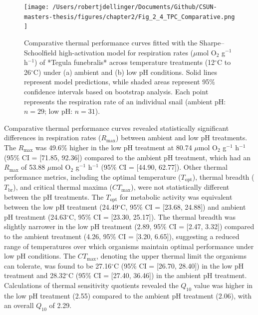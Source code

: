 \documentclass{CSUNthesis}
\begin{document}
\begin{figure}[H]
  \centering
  \texttt{[image:  /Users/robertjdellinger/Documents/Github/CSUN-masters-thesis/figures/chapter2/Fig\_2\_4\_TPC\_Comparative.png ]}
  \caption[Comparative thermal performance curves for ambient and low pH treatments.]{Comparative thermal performance curves fitted with the Sharpe--Schoolfield high-activation model for respiration rates ($\mu$mol O$_2$ g$^{-1}$ h$^{-1}$) of *Tegula funebralis* across temperature treatments (12$^\circ$C to 26$^\circ$C) under (a) ambient and (b) low pH conditions. Solid lines represent model predictions, while shaded areas represent 95\% confidence intervals based on bootstrap analysis. Each point represents the respiration rate of an individual snail (ambient pH: $n=29$; low pH: $n=31$).}
  \label{fig:tpc_comparative}
\end{figure}

Comparative thermal performance curves revealed statistically significant differences in respiration rates (\(R_{\text{max}}\)) between ambient and low pH treatments. The \(R_{\text{max}}\) was 49.6\% higher in the low pH treatment at 80.74 \(\mu\)mol O\(_2\) g\(^{-1}\) h\(^{-1}\) (95\% CI = {[}71.85, 92.36{]}) compared to the ambient pH treatment, which had an \(R_{\text{max}}\) of 53.88 \(\mu\)mol O\(_2\) g\(^{-1}\) h\(^{-1}\) (95\% CI = {[}44.90, 62.77{]}). Other thermal performance metrics, including the optimal temperature (\(T_{\text{opt}}\)), thermal breadth (\(T_{\text{br}}\)), and critical thermal maxima (\(CT_{\text{max}}\)), were not statistically different between the pH treatments. The \(T_{\text{opt}}\) for metabolic activity was equivalent between the low pH treatment (24.49\(^\circ\)C, 95\% CI = {[}23.68, 24.88{]}) and ambient pH treatment (24.63\(^\circ\)C, 95\% CI = {[}23.30, 25.17{]}). The thermal breadth was slightly narrower in the low pH treatment (2.89, 95\% CI = {[}2.47, 3.32{]}) compared to the ambient treatment (4.26, 95\% CI = {[}3.20, 6.65{]}), suggesting a reduced range of temperatures over which organisms maintain optimal performance under low pH conditions. The \(CT_{\text{max}}\), denoting the upper thermal limit the organisms can tolerate, was found to be 27.16\(^\circ\)C (95\% CI = {[}26.70, 28.40{]}) in the low pH treatment and 28.32\(^\circ\)C (95\% CI = {[}27.40, 36.46{]}) in the ambient pH treatment. Calculations of thermal sensitivity quotients revealed the \(Q_{10}\) value was higher in the low pH treatment (2.55) compared to the ambient pH treatment (2.06), with an overall \(Q_{10}\) of 2.29.
\end{document}
